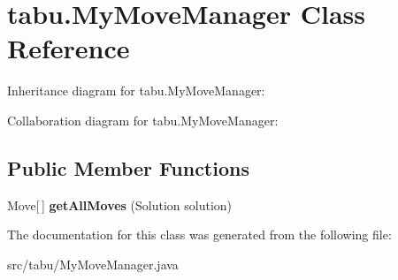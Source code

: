 \hypertarget{classtabu_1_1_my_move_manager}{}\section{tabu.\+My\+Move\+Manager Class Reference}
\label{classtabu_1_1_my_move_manager}


Inheritance diagram for tabu.\+My\+Move\+Manager\+:


Collaboration diagram for tabu.\+My\+Move\+Manager\+:
\subsection*{Public Member Functions}
\begin{DoxyCompactItemize}
\item 
Move\mbox{[}$\,$\mbox{]} {\bfseries get\+All\+Moves} (Solution solution)\hypertarget{classtabu_1_1_my_move_manager_ab6b881066c53de1366fbf125c8c1bb32}{}\label{classtabu_1_1_my_move_manager_ab6b881066c53de1366fbf125c8c1bb32}

\end{DoxyCompactItemize}


The documentation for this class was generated from the following file\+:\begin{DoxyCompactItemize}
\item 
src/tabu/My\+Move\+Manager.\+java\end{DoxyCompactItemize}
